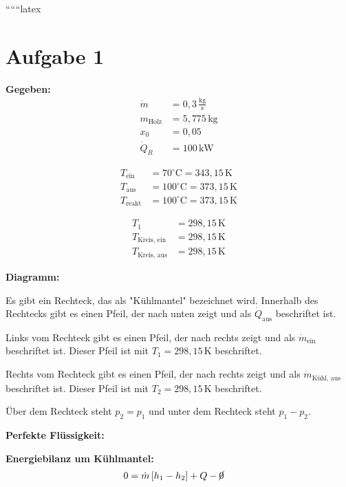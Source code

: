 
``````latex


\section*{Aufgabe 1}

\textbf{Gegeben:}
\begin{align*}
    \dot{m} &= 0{,}3 \, \frac{\text{kg}}{\text{s}} \\
    m_{\text{Holz}} &= 5{,}775 \, \text{kg} \\
    x_0 &= 0{,}05 \\
    \dot{Q}_R &= 100 \, \text{kW}
\end{align*}

\begin{align*}
    T_{\text{ein}} &= 70^\circ \text{C} = 343{,}15 \, \text{K} \\
    T_{\text{aus}} &= 100^\circ \text{C} = 373{,}15 \, \text{K} \\
    T_{\text{reakt}} &= 100^\circ \text{C} = 373{,}15 \, \text{K}
\end{align*}

\begin{align*}
    T_1 &= 298{,}15 \, \text{K} \\
    T_{\text{Kreis, ein}} &= 298{,}15 \, \text{K} \\
    T_{\text{Kreis, aus}} &= 298{,}15 \, \text{K}
\end{align*}

\textbf{Diagramm:}

Es gibt ein Rechteck, das als "Kühlmantel" bezeichnet wird. Innerhalb des Rechtecks gibt es einen Pfeil, der nach unten zeigt und als $\dot{Q}_{\text{aus}}$ beschriftet ist. 

Links vom Rechteck gibt es einen Pfeil, der nach rechts zeigt und als $\dot{m}_{\text{ein}}$ beschriftet ist. Dieser Pfeil ist mit $T_1 = 298{,}15 \, \text{K}$ beschriftet. 

Rechts vom Rechteck gibt es einen Pfeil, der nach rechts zeigt und als $\dot{m}_{\text{Kühl, aus}}$ beschriftet ist. Dieser Pfeil ist mit $T_2 = 298{,}15 \, \text{K}$ beschriftet. 

Über dem Rechteck steht $p_2 = p_1$ und unter dem Rechteck steht $p_1 - p_2$.

\textbf{Perfekte Flüssigkeit:}

\textbf{Energiebilanz um Kühlmantel:}
\begin{align*}
    0 &= \dot{m} \left[ h_1 - h_2 \right] + Q - \cancel{0}
\end{align*}

